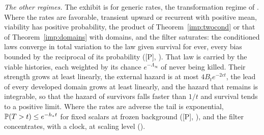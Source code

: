 \emph{The other regimes.} The exhibit is for generic rates, the
transformation regime of \cite{GoldenSurvivorship}. Where the rates are favorable,
transient upward or recurrent with positive mean, viability has positive
probability, the product of Theorem~\ref{imp:twocond} or that of Theorem~\ref{imp:domains} with domains, and
the filter saturates: the conditioned laws converge in total variation to
the law given survival for ever, every bias bounded by the reciprocal of its
probability ([P], \cite{GoldenSurvivorship}). That law is carried by the viable histories, each weighted by its chance $e^{-\Lambda_\infty}$ of never being killed.
Their strength grows at least linearly, the external hazard is at most
$4B_te^{-2ct}$, the lead of every developed domain grows at least
linearly, and the hazard that remains is integrable, so that the hazard
of survivors falls faster than $1/t$ and survival tends to a positive
limit. Where the rates are adverse the tail is exponential,
$\mathbb{P}(T>t)\le e^{-h_\ast t}$ for fixed scalars at frozen background ([P],
\cite{GoldenSurvivorship}), and the filter concentrates, with a clock, at scaling level
(\cite{GoldenSurvivorship}).

